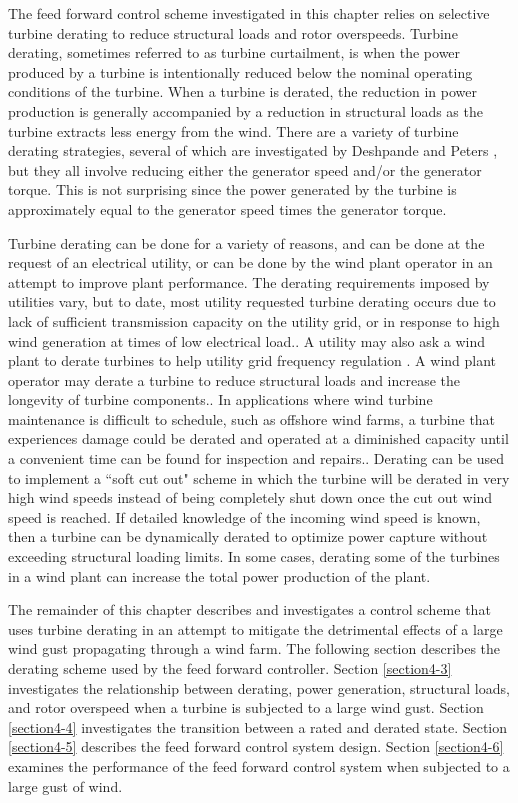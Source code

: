The feed forward control scheme investigated in this chapter relies on selective turbine derating to reduce structural loads and rotor overspeeds. Turbine derating, sometimes referred to as turbine curtailment, is when the power produced by a turbine is intentionally reduced below the nominal operating conditions of the turbine. When a turbine is derated, the reduction in power production is generally accompanied by a reduction in structural loads as the turbine extracts less energy from the wind. There are a variety of turbine derating strategies, several of which are investigated by Deshpande and Peters \cite{deshpande2012}, but they all involve reducing either the generator speed and/or the generator torque. This is not surprising since the power generated by the turbine is approximately equal to the generator speed times the generator torque.

Turbine derating can be done for a variety of reasons, and can be done at the request of an electrical utility, or can be done by the wind plant operator in an attempt to improve plant performance. The derating requirements imposed by utilities vary, but to date, most utility requested turbine derating occurs due to lack of sufficient transmission capacity on the utility grid, or in response to high wind generation at times of low electrical load.\cite{fink2009}. A utility may also ask a wind plant to derate turbines to help utility grid frequency regulation \cite{aho2012,aho2013}. A wind plant operator may derate a turbine to reduce structural loads and increase the longevity of turbine components.\cite{biegel2013}. In applications where wind turbine maintenance is difficult to schedule, such as offshore wind farms, a turbine that experiences damage could be derated and operated at a diminished capacity until a convenient time can be found for inspection and repairs.\cite{richards2014,griffith2015}. Derating can be used to implement a ``soft cut out" scheme in which the turbine will be derated in very high wind speeds instead of being completely shut down once the cut out wind speed is reached. \cite{jelavic2013} If detailed knowledge of the incoming wind speed is known, then a turbine can be dynamically derated to optimize power capture without exceeding structural loading limits.\cite{petrovic2014,petrovic2015,jelavic2013} In some cases, derating some of the turbines in a wind plant can increase the total power production of the plant.\cite{carlen2010} 
 
 The remainder of this chapter describes and investigates a control scheme that uses turbine derating in an attempt to mitigate the detrimental effects of a large wind gust propagating through a wind farm. The following section describes the derating scheme used by the feed forward controller. Section \ref{section4-3} investigates the relationship between derating, power generation, structural loads, and rotor overspeed when a turbine is subjected to a large wind gust. Section \ref{section4-4} investigates the transition between a rated and derated state. Section \ref{section4-5} describes the feed forward control system design. Section \ref{section4-6} examines the performance of the feed forward control system when subjected to a large gust of wind. 



